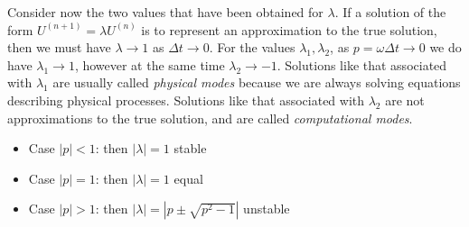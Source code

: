 Consider now the two values that have been obtained for $\lambda$. If a solution of the form $U^{(n+1)}=\lambda U^{(n)}$ is to represent an approximation to the true solution, then we must have $\lambda\rightarrow 1$ as $\Delta t\rightarrow0$. For the values $\lambda_1, \lambda_2$, as $p=\omega\Delta t\rightarrow0$ we do have $\lambda_1\rightarrow1$, however at the same time $\lambda_2\rightarrow-1$. Solutions like that associated with $\lambda_1$ are usually called \textit{physical modes} because we are always solving equations describing physical processes. Solutions like that associated with $\lambda_2$ are not approximations to the true solution, and are called \textit{computational modes}.
\begin{itemize}
	\item Case $|p|<1$: then $|\lambda|=1$ stable
	\item Case $|p|=1$: then $|\lambda|=1$ equal
	\item Case $|p|>1$: then $|\lambda|=|p\pm\sqrt{p^2-1}|$ unstable
\end{itemize}
